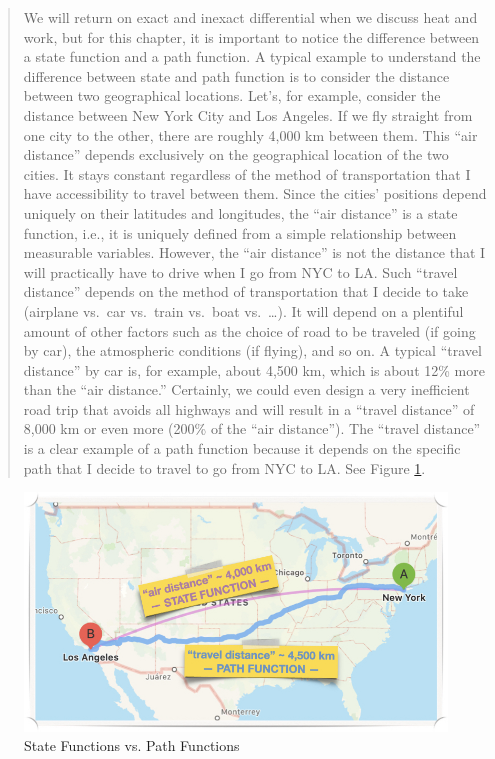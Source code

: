 \documentclass[
]{book}
\theoremstyle{definition}
\theoremstyle{definition}
\theoremstyle{definition}
\theoremstyle{remark}
\begin{document}
\begin{quote}
We will return on exact and inexact differential when we discuss heat and work, but for this chapter, it is important to notice the difference between a state function and a path function. A typical example to understand the difference between state and path function is to consider the distance between two geographical locations. Let's, for example, consider the distance between New York City and Los Angeles. If we fly straight from one city to the other, there are roughly 4,000 km between them. This ``air distance'' depends exclusively on the geographical location of the two cities. It stays constant regardless of the method of transportation that I have accessibility to travel between them. Since the cities' positions depend uniquely on their latitudes and longitudes, the ``air distance'' is a state function, i.e., it is uniquely defined from a simple relationship between measurable variables. However, the ``air distance'' is not the distance that I will practically have to drive when I go from NYC to LA. Such ``travel distance'' depends on the method of transportation that I decide to take (airplane vs.~car vs.~train vs.~boat vs.~\ldots). It will depend on a plentiful amount of other factors such as the choice of road to be traveled (if going by car), the atmospheric conditions (if flying), and so on. A typical ``travel distance'' by car is, for example, about 4,500 km, which is about 12\% more than the ``air distance.'' Certainly, we could even design a very inefficient road trip that avoids all highways and will result in a ``travel distance'' of 8,000 km or even more (200\% of the ``air distance''). The ``travel distance'' is a clear example of a path function because it depends on the specific path that I decide to travel to go from NYC to LA. See Figure \ref{fig:Fig2c1}.
\end{quote}

\begin{figure}

{\centering \includegraphics[width=0.8\linewidth]{./img/OEP_Figures.002} 

}

\caption{State Functions vs. Path Functions}\label{fig:Fig2c1}
\end{figure}
\end{document}
